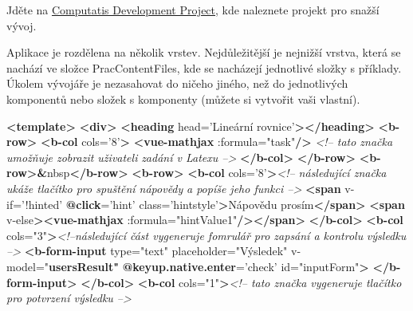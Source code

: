 \documentclass[
]{article}
\newenvironment{Shaded}{}{}
\newcommand{\CommentTok}[1]{\textcolor[rgb]{0.38,0.63,0.69}{\textit{#1}}}
\newcommand{\ErrorTok}[1]{\textcolor[rgb]{1.00,0.00,0.00}{\textbf{#1}}}
\newcommand{\KeywordTok}[1]{\textcolor[rgb]{0.00,0.44,0.13}{\textbf{#1}}}
\newcommand{\NormalTok}[1]{#1}
\newcommand{\OtherTok}[1]{\textcolor[rgb]{0.00,0.44,0.13}{#1}}
\newcommand{\StringTok}[1]{\textcolor[rgb]{0.25,0.44,0.63}{#1}}
\begin{document}
Jděte na
\href{https://github.com/kubajj/ComputatisDevelopmentProject}{Computatis
Development Project}, kde naleznete projekt pro snažší vývoj.

Aplikace je rozdělena na několik vrstev. Nejdůležitější je nejnižší
vrstva, která se nachází ve složce PracContentFiles, kde se nacházejí
jednotlivé složky s příklady. Úkolem vývojáře je nezasahovat do ničeho
jiného, než do jednotlivých komponentů nebo složek s komponenty (můžete
si vytvořit vaši vlastní).

\begin{Shaded}
\begin{Highlighting}[]
\KeywordTok{<template>}
    \KeywordTok{<div>}
        \KeywordTok{<heading}\OtherTok{ head=}\StringTok{'Lineární rovnice'}\KeywordTok{></heading>}
        \KeywordTok{<b-row>}
            \KeywordTok{<b-col}\OtherTok{ cols=}\StringTok{'8'}\KeywordTok{>}
                \KeywordTok{<vue-mathjax}\OtherTok{ :formula=}\StringTok{"task"}\KeywordTok{/>} \CommentTok{<!-- tato značka umožňuje zobrazit uživateli }
\CommentTok{                zadání v Latexu -->}
            \KeywordTok{</b-col>}
        \KeywordTok{</b-row>}
        \KeywordTok{<b-row>}\ErrorTok{&}\NormalTok{nbsp}\KeywordTok{</b-row>}
        \KeywordTok{<b-row>}
            \KeywordTok{<b-col}\OtherTok{ cols=}\StringTok{'8'}\KeywordTok{>}\CommentTok{<!-- následující značka ukáže tlačítko pro spuštění nápovědy }
\CommentTok{            a popíše jeho funkci -->}
                \KeywordTok{<span}\OtherTok{ v-if=}\StringTok{'!hinted'} \ErrorTok{@click}\OtherTok{=}\StringTok{'hint'}\OtherTok{ class=}\StringTok{'hintstyle'}\KeywordTok{>}\NormalTok{Nápovědu prosím}\KeywordTok{</span>}
                \KeywordTok{<span}\OtherTok{ v-else}\KeywordTok{><vue-mathjax}\OtherTok{ :formula=}\StringTok{"hintValue1"}\KeywordTok{/></span>}
            \KeywordTok{</b-col>}
            \KeywordTok{<b-col}\OtherTok{ cols=}\StringTok{"3"}\KeywordTok{>}\CommentTok{<!--následující část vygeneruje fomrulář pro zapsání a kontrolu }
\CommentTok{            výsledku -->}
                \KeywordTok{<b-form-input}
\OtherTok{                        type=}\StringTok{"text"}
\OtherTok{                        placeholder=}\StringTok{"Výsledek"}
\StringTok{                        v-model="}\ErrorTok{usersResult"}
                        \ErrorTok{@keyup.native.enter}\OtherTok{=}\StringTok{'check'}
\OtherTok{                        id=}\StringTok{"inputForm"}\KeywordTok{>}                     
                \KeywordTok{</b-form-input>}
            \KeywordTok{</b-col>}
            \KeywordTok{<b-col}\OtherTok{ cols=}\StringTok{"1"}\KeywordTok{>}\CommentTok{<!-- tato značka vygeneruje tlačítko pro potvrzení výsledku -->}

\end{Highlighting}
\end{Shaded}
\end{document}
